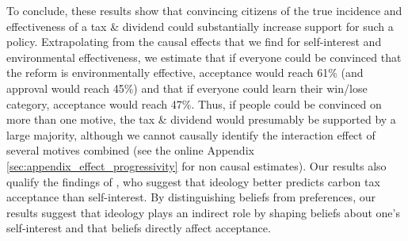 \documentclass[12pt]{article} %
\begin{document}
To conclude, these results show that convincing citizens of the true incidence and effectiveness of a tax \& dividend could substantially increase support for such a policy. Extrapolating from the causal effects that we find for self-interest and environmental effectiveness, we estimate that if everyone could be convinced that the reform is environmentally effective, acceptance would reach 61\% (and approval would reach 45\%) and that if everyone could learn their win/lose category, acceptance would reach 47\%. Thus, if people could be convinced on more than one motive, the tax \& dividend would presumably be supported by a large majority, although we cannot causally identify the interaction effect of several motives combined (see the online Appendix \ref{sec:appendix_effect_progressivity} for non causal estimates). Our results also qualify the findings of \citet{anderson_can_2019}, who suggest that ideology better predicts carbon tax acceptance than self-interest. By distinguishing beliefs from preferences, our results suggest that ideology plays an indirect role by shaping beliefs about one's self-interest and that beliefs directly affect acceptance.
\end{document}
